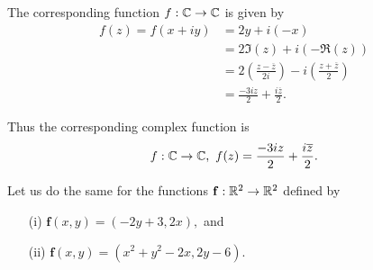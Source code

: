 \begin{solution}
The corresponding function $f:\mathbb{C} \to \mathbb{C}$ is given by
\begin{align*}
f(z)= f(x+iy)&=2y+i(-x) \\
& = 2 \Im (z) +i ( - \Re (z) ) \\
& = 2 \left( \frac{z-\overline{z}}{2i} \right)-i \left( \frac{z+\overline{z}}{2} \right) \\
&=\frac{-3i z}{2}+\frac{i\overline{z}}{2}.
\end{align*}

Thus the corresponding complex function is
\begin{equation*}
f: \mathbb{C} \to \mathbb{C}, \ f(z)= \frac{-3i z}{2}+\frac{i\overline{z}}{2}.
\end{equation*}
\end{solution}





\begin{example}
Let us do the same for the functions $\mathbf{f}:\mathbb{R}^2 \to \mathbb{R}^2$ defined by
\begin{enumerate}
\item[(i)] $\mathbf{f} (x,y) = (-2y+3,2x),$ and
\item[(ii)] $\mathbf{f}(x,y) = (x^2+y^2-2x,2y-6)$.
\end{enumerate}

\end{example}

